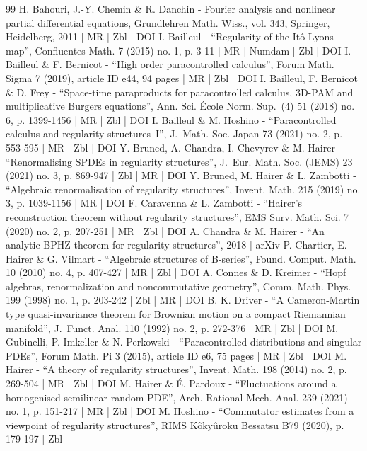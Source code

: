 \begin{thebibliography}{99}
H. Bahouri, J.-Y. Chemin \& R. Danchin - Fourier analysis and nonlinear partial differential equations, Grundlehren Math. Wiss., vol. 343, Springer, Heidelberg, 2011 | MR | Zbl | DOI
I. Bailleul - “Regularity of the Itô-Lyons map”, Confluentes Math. 7 (2015) no. 1, p. 3-11 | MR | Numdam | Zbl | DOI
I. Bailleul \& F. Bernicot - “High order paracontrolled calculus”, Forum Math. Sigma 7 (2019), article ID e44, 94 pages | MR | Zbl | DOI
I. Bailleul, F. Bernicot \& D. Frey - “Space-time paraproducts for paracontrolled calculus, 3D-PAM and multiplicative Burgers equations”, Ann. Sci. École Norm. Sup. (4) 51 (2018) no. 6, p. 1399-1456 | MR | Zbl | DOI
I. Bailleul \& M. Hoshino - “Paracontrolled calculus and regularity structures I”, J. Math. Soc. Japan 73 (2021) no. 2, p. 553-595 | MR | Zbl | DOI
Y. Bruned, A. Chandra, I. Chevyrev \& M. Hairer - “Renormalising SPDEs in regularity structures”, J. Eur. Math. Soc. (JEMS) 23 (2021) no. 3, p. 869-947 | Zbl | MR | DOI
Y. Bruned, M. Hairer \& L. Zambotti - “Algebraic renormalisation of regularity structures”, Invent. Math. 215 (2019) no. 3, p. 1039-1156 | MR | DOI
F. Caravenna \& L. Zambotti - “Hairer’s reconstruction theorem without regularity structures”, EMS Surv. Math. Sci. 7 (2020) no. 2, p. 207-251 | MR | Zbl | DOI
A. Chandra \& M. Hairer - “An analytic BPHZ theorem for regularity structures”, 2018 | arXiv
P. Chartier, E. Hairer \& G. Vilmart - “Algebraic structures of B-series”, Found. Comput. Math. 10 (2010) no. 4, p. 407-427 | MR | Zbl | DOI
A. Connes \& D. Kreimer - “Hopf algebras, renormalization and noncommutative geometry”, Comm. Math. Phys. 199 (1998) no. 1, p. 203-242 | Zbl | MR | DOI
B. K. Driver - “A Cameron-Martin type quasi-invariance theorem for Brownian motion on a compact Riemannian manifold”, J. Funct. Anal. 110 (1992) no. 2, p. 272-376 | MR | Zbl | DOI
M. Gubinelli, P. Imkeller \& N. Perkowski - “Paracontrolled distributions and singular PDEs”, Forum Math. Pi 3 (2015), article ID e6, 75 pages | MR | Zbl | DOI
M. Hairer - “A theory of regularity structures”, Invent. Math. 198 (2014) no. 2, p. 269-504 | MR | Zbl | DOI
M. Hairer \& É. Pardoux - “Fluctuations around a homogenised semilinear random PDE”, Arch. Rational Mech. Anal. 239 (2021) no. 1, p. 151-217 | MR | Zbl | DOI
M. Hoshino - “Commutator estimates from a viewpoint of regularity structures”, RIMS Kôkyûroku Bessatsu B79 (2020), p. 179-197 | Zbl

\end{thebibliography}
